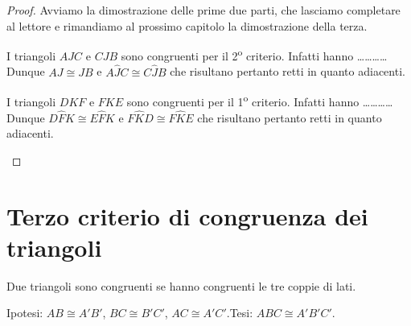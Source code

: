 \begin{proof}
Avviamo la dimostrazione delle prime due parti, che lasciamo 
completare al lettore e rimandiamo al prossimo capitolo la 
dimostrazione della terza.

\begin{enumeratea}
\item I triangoli \(AJC\) e \(CJB\) sono congruenti per il 
2\textsuperscript{o} criterio. Infatti hanno 
\ldots\ldots\ldots\ldots{}\\
Dunque \(AJ\cong JB\) e \(A\widehat{J}C\cong C\widehat{J}B\) che 
risultano pertanto retti in quanto adiacenti.  
\item I triangoli \(DKF\) e \(FKE\) sono congruenti per il 
1\textsuperscript{o} criterio. Infatti hanno 
\ldots\ldots\ldots\ldots{}\\
Dunque \(D\widehat{F}K\cong E\widehat{F}K\) e \(F\widehat{K}D\cong 
F\widehat{K}E\) che risultano pertanto retti in quanto adiacenti.
\end{enumeratea}
\end{proof}

\section{Terzo criterio di congruenza dei 
triangoli}\label{sect:terzo_criterio_congruenza_triangoli}

\begin{teorema}
Due triangoli sono congruenti se hanno congruenti le tre coppie di 
lati.
\end{teorema}


\begin{inaccessibleblock}
 \begin{figure}[htb]
\centering
\end{figure}
\end{inaccessibleblock}

\noindent Ipotesi: \(AB\cong A'B'\), \(BC\cong B'C'\), \(AC\cong 
A'C'\).\tab Tesi: \(ABC\cong A'B'C'\).


\begin{inaccessibleblock}
 \begin{figure}[htb]
\centering
\end{figure}
\end{inaccessibleblock}

